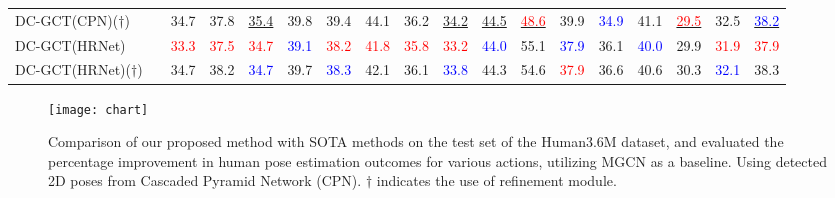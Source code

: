 \documentclass[journal]{IEEEtran}
\begin{document}
\begin{table*}[htbp]
{\begin{tabular}{lr|ccccccccccccccc|c}
DC-GCT(CPN)($\dagger$)  &            &34.7 &37.8 &\underline{35.4} &39.8 &39.4 &44.1 &36.2 &\underline{34.2} &\underline{44.5} &\underline{ \textcolor{red}{48.6}} &39.9 &\textcolor{blue}{34.9} &41.1 &\underline{ \textcolor{red}{29.5}} &32.5 &\underline{ \textcolor{blue}{38.2}} \\

DC-GCT(HRNet) &                        &\textcolor{red}{33.3}  &\textcolor{red}{37.5}  &\textcolor{red}{34.7}  &\textcolor{blue}{39.1}  &\textcolor{red}{38.2}  &\textcolor{red}{41.8}  &\textcolor{red}{35.8}  &\textcolor{red}{33.2}  &\textcolor{blue}{44.0}  &55.1  &\textcolor{blue}{37.9}  &36.1  &\textcolor{blue}{40.0}  &29.9  &\textcolor{red}{31.9}  &\textcolor{red}{37.9}  \\
DC-GCT(HRNet)($\dagger$)  &            &34.7 &38.2 &\textcolor{blue}{34.7} &39.7 &\textcolor{blue}{38.3} &42.1 &36.1 &\textcolor{blue}{33.8} &44.3 &54.6 &\textcolor{red}{37.9} &36.6 &40.6 &30.3 &\textcolor{blue}{32.1} &38.3 \\
\bottomrule[1mm]

\end{tabular}
}
\end{table*}


\begin{figure}[t]
\centering
\texttt{[image: chart]}
\caption{Comparison of our proposed method with SOTA methods \cite{zou2021modulated,cai2023htnet} on the test set of the Human3.6M dataset, and evaluated the percentage improvement in human pose estimation outcomes for various actions, utilizing MGCN \cite{zou2021modulated} as a baseline. Using detected 2D poses from Cascaded Pyramid Network (CPN)\cite{chen2018cascaded}. $\dagger$ indicates the use of refinement module.}
\label{fig:chart}
\end{figure}
\end{document}
